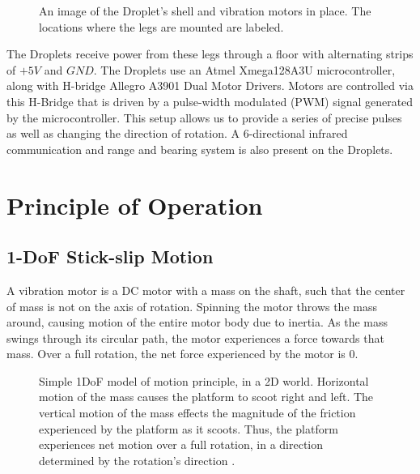 \documentclass[letterpaper, 10pt, conference]{ieeeconf}
\begin{document}
\begin{figure}[!htb]
	\centering
	
	\caption{An image of the Droplet's shell and vibration motors in place. The locations where the legs are mounted are labeled.}
	\label{fig:PWMs}
\end{figure}

The Droplets receive power from these legs through a floor with alternating strips of $+5V$ and $GND$. The Droplets use an Atmel Xmega128A3U microcontroller, along with H-bridge Allegro A3901 Dual Motor Drivers. Motors are controlled via this H-Bridge that is driven by a pulse-width modulated (PWM) signal generated by the microcontroller. This setup allows us to provide a series of precise pulses as well as changing the direction of rotation. A 6-directional infrared communication and range and bearing system \cite{farrow14} is also present on the Droplets.


\section{Principle of Operation}

\subsection{1-DoF Stick-slip Motion}
A vibration motor is a DC motor with a mass on the shaft, such that the center of mass is not on the axis of rotation. Spinning the motor throws the mass around, causing motion of the entire motor body due to inertia. As the mass swings through its circular path, the motor experiences a force towards that mass. Over a full rotation, the net force experienced by the motor is 0.

\begin{figure}[!htb]
\centering

\caption{Simple 1DoF model of motion principle, in a 2D world. Horizontal motion of the mass causes the platform to scoot right and left. The vertical motion of the mass effects the magnitude of the friction experienced by the platform as it scoots. Thus, the platform experiences net motion over a full rotation, in a direction determined by the rotation's direction \cite{Vartholomeos2005}.}
\label{motorDiagram}
\end{figure}
\end{document}
